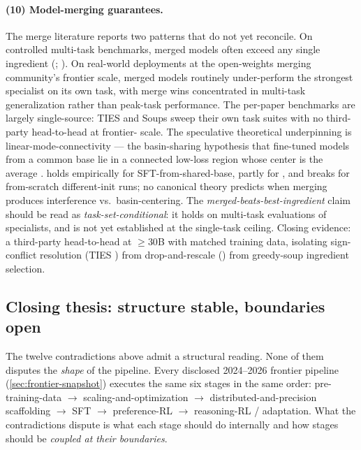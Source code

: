 \paragraph{(10) Model-merging guarantees.}
The merge literature reports two patterns that do not yet reconcile.
On controlled multi-task benchmarks, merged models often exceed any
single ingredient (\citealp[\S 4]{wortsman2022-model-soups};
\citealp[\S 4]{yadav2023-ties-merging}). On real-world deployments at
the open-weights  merging community's frontier scale, merged
models routinely under-perform the strongest specialist on its own
task, with merge wins concentrated in multi-task generalization
rather than peak-task performance. The per-paper benchmarks are
largely single-source: TIES and Soups sweep their own task suites
with no third-party head-to-head at frontier- scale. The
speculative theoretical underpinning is linear-mode-connectivity ---
the basin-sharing hypothesis that fine-tuned models from a common
base lie in a connected low-loss region whose center is the average
\citep{ilharco2022-task-vectors,wortsman2022-model-soups}.  holds
empirically for SFT-from-shared-base, partly for , and breaks
for from-scratch different-init runs; no canonical theory predicts
when merging produces interference vs.\ basin-centering. The
\emph{merged-beats-best-ingredient} claim should be read as
\emph{task-set-conditional}: it holds on multi-task evaluations of
specialists, and is not yet established at the single-task ceiling.
Closing evidence: a third-party head-to-head at $\geq$$30$B with
matched training data, isolating sign-conflict resolution
(TIES \citep{yadav2023-ties-merging}) from drop-and-rescale ()
from greedy-soup ingredient selection.

\subsection{Closing thesis: structure stable, boundaries open}
\label{sec:contradictions-thesis}

The twelve contradictions above admit a structural reading. None of
them disputes the \emph{shape} of the pipeline. Every disclosed
2024--2026 frontier pipeline (\cref{sec:frontier-snapshot}) executes
the same six stages in the same order: pre-training-data $\to$
scaling-and-optimization $\to$ distributed-and-precision
scaffolding $\to$ SFT $\to$ preference-RL $\to$ reasoning-RL /
adaptation. What the contradictions dispute is what each stage
should do internally and how stages should be \emph{coupled at their
boundaries}.


